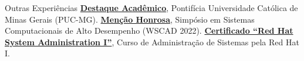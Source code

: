 \begin{rubric}{Outras Experiências}
\entry*[2023] \textbf{\href{https://drive.google.com/file/d/12qYDL3kjxXrC2aeyzYn55hH6AOMMZ2Ni/view?usp=sharing}{Destaque Acadêmico}}, Pontifícia Universidade Católica de Minas Gerais (PUC-MG).
%
\entry*[2022] \textbf{\href{https://drive.google.com/file/d/1EJsnv8WvVObpRNreRR2fV2hepMs9ifsz/view?usp=sharing}{Menção Honrosa}}, Simpósio em Sistemas Computacionais de Alto Desempenho (WSCAD 2022).
%
\entry*[2021] \textbf{\href{https://drive.google.com/file/d/1lU3JSlKmsZNY8PTN7REnLiKwlH6Fkpzm/view?usp=sharing}{Certificado ``Red Hat System Administration I''}}, Curso de Administração de Sistemas pela Red Hat I.


\end{rubric}
